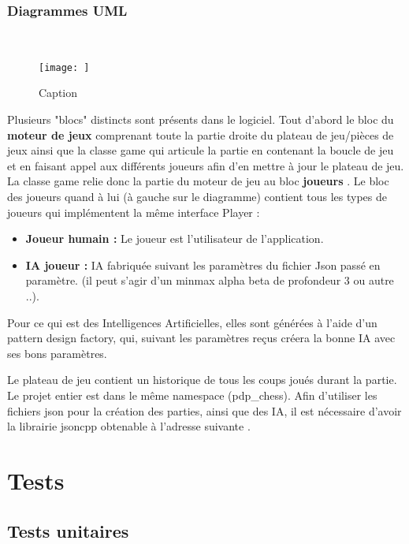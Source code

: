 \huge\documentclass{article}
\begin{document}
    \subsubsection{Diagrammes UML}
    ~~\\
    \newline
    \begin{figure}
        \centering
        \texttt{[image: ]}
        \caption{Caption}
        \label{uml}
    \end{figure}
    \newline
    Plusieurs "blocs" distincts sont présents dans le logiciel.
    \newline
    Tout d'abord le bloc du \textbf{moteur de jeux} comprenant toute la partie droite du plateau de jeu/pièces de jeux ainsi que la classe game qui articule la partie en contenant la boucle de jeu et en faisant appel aux différents joueurs afin d'en mettre à jour le plateau de jeu.
    La classe game relie donc la partie du moteur de jeu au bloc \textbf{joueurs} .
    \newline
    Le bloc des joueurs quand à lui (à gauche sur le diagramme) contient tous les types de joueurs qui implémentent la même interface Player :
    \medskip
    \begin{itemize}
        \item \textbf{Joueur humain :} Le joueur est l'utilisateur de l'application.
        \item \textbf{IA joueur :} IA fabriquée suivant les paramètres du fichier Json passé en paramètre. (il peut s'agir d'un minmax alpha beta de profondeur 3 ou autre ..).
    \end{itemize}
    \medskip
    Pour ce qui est des Intelligences Artificielles, elles sont générées à l'aide d'un pattern design factory, qui, suivant les paramètres reçus créera la bonne IA avec ses bons paramètres.

    Le plateau de jeu contient un historique de tous les coups joués durant la partie.
    \medskip
    Le projet entier est dans le même namespace (pdp\_chess).
    Afin d'utiliser les fichiers json pour la création des parties, ainsi que des IA, il est nécessaire d'avoir la librairie jsoncpp obtenable à l'adresse suivante \cite{JsonCpp}.

    \medskip

    \section{Tests}
    \subsection{Tests unitaires}
\end{document}
